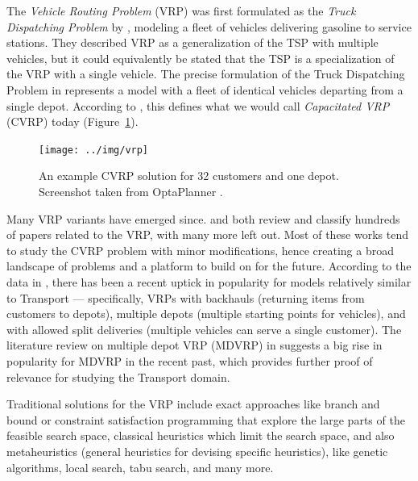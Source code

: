 The \textit{Vehicle Routing Problem} (VRP) was first formulated as the \textit{Truck Dispatching Problem} by \citet{Dantzig1959}, modeling a fleet of vehicles delivering gasoline to service stations. They described VRP
as a generalization of the TSP with multiple vehicles, but it could equivalently be stated that the TSP is a specialization of the VRP
with a single vehicle. The precise formulation of the Truck Dispatching Problem in \citep[Section~2]{Dantzig1959} represents a model with a fleet of identical vehicles departing from a single depot. According to \citet[Section~3]{Braekers2016}, this defines what we would call \textit{Capacitated VRP} (CVRP) today (Figure~\ref{fig:vrp}).

\begin{figure}[tbp]
\begin{center}
\texttt{[image: ../img/vrp]}
\end{center}
\caption[An example CVRP solution for 32 customers and one depot.]{An example CVRP solution for 32 customers and one depot. Screenshot taken from OptaPlanner \citep{DeSmet2017}.}
\label{fig:vrp}
\end{figure}

Many VRP variants have emerged since. \citet{Eksioglu2009} and \citet{Braekers2016} both
review and classify hundreds of papers related to the VRP, with many more left out.
Most of these works tend to study the CVRP problem with minor modifications, hence creating
a broad landscape of problems and a platform to build on for the future.
According to the data in \citet[Table~4]{Braekers2016}, there has been a recent uptick
in popularity for models relatively similar to Transport --- specifically, VRPs with
backhauls (returning items from customers to depots),
multiple depots (multiple starting points for vehicles), and with allowed split deliveries (multiple
vehicles can serve a single customer).
The literature review on multiple depot VRP (MDVRP) in \citet{Montoya-Torres2015}
suggests a big rise in popularity for MDVRP in the recent past,
which provides further proof of relevance for studying the Transport domain.

Traditional solutions for the VRP include exact approaches like branch and bound
or constraint satisfaction
programming
that explore the large parts of the feasible search space,
classical heuristics which limit the search space, and also metaheuristics (general heuristics for devising specific heuristics), like genetic algorithms, local search, tabu search, and many more.


